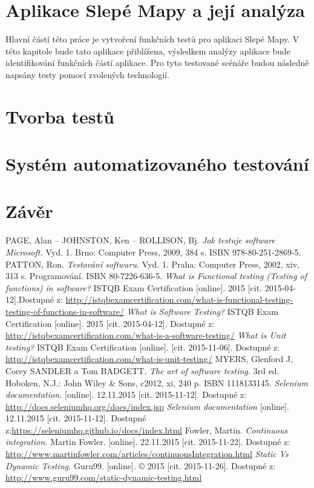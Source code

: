 \documentclass[
    color,   %
	table,   %
    twoside, %
]{fithesis3}
\begin{document}
\chapter{Aplikace Slepé Mapy a její analýza}
Hlavní částí této práce je vytvoření funkčních testů pro aplikaci Slepé Mapy. V této kapitole bude tato aplikace přiblížena, výsledkem analýzy aplikace bude identifikování funkčních částí aplikace. Pro tyto testované scénáře budou následně napsány testy pomocí zvolených technologií.
\chapter{Tvorba testů}
\chapter{Systém automatizovaného testování}
\chapter{Závěr}
\renewcommand{\refname}{Seznam literatury}
\begin{thebibliography}{9}
PAGE, Alan – JOHNSTON, Ken – ROLLISON, Bj. \emph{Jak testuje software Microsoft.} Vyd. 1. Brno: Computer Press, 2009, 384 s. ISBN 978-80-251-2869-5.
PATTON, Ron. \emph{Testování softwaru.} Vyd. 1. Praha: Computer Press, 2002, xiv, 313 s. Programování. ISBN 80-7226-636-5. 
\emph{What is Functional testing (Testing of functions) in software?} ISTQB Exam Certification [online]. 2015 [cit. 2015-04-12].Dostupné z: \url{http://istqbexamcertification.com/what-is-functional-testing-testing-of-functions-in-software/}
\emph{What is Software Testing?} ISTQB Exam Certification [online]. 2015 [cit. 2015-04-12]. Dostupné z: \url{http://istqbexamcertification.com/what-is-a-software-testing/}
\emph{What is Unit testing?} ISTQB Exam Certification [online]. [cit. 2015-11-06]. Dostupné z: \url{http://istqbexamcertification.com/what-is-unit-testing/}
MYERS, Glenford J, Corey SANDLER a Tom BADGETT. \emph{The art of software testing.} 3rd ed. Hoboken, N.J.: John Wiley \& Sons, c2012, xi, 240 p. ISBN 1118133145.
\emph{Selenium documentation.} [online]. 12.11.2015 [cit. 2015-11-12]. Dostupné z: \url{http://docs.seleniumhq.org/docs/index.jsp}
\emph{Selenium documentation} [online]. 12.11.2015 [cit. 2015-11-12]. Dostupné z:\url{https://seleniumhq.github.io/docs/index.html}
Fowler, Martin. \emph{Continuous integration.} Martin Fowler. [online]. 22.11.2015 [cit. 2015-11-22]. Dostupné z: \url{http://www.martinfowler.com/articles/continuousIntegration.html}
 \emph{Static Vs Dynamic Testing.} Guru99. [online]. © 2015 [cit. 2015-11-26]. Dostupné z: \url{http://www.guru99.com/static-dynamic-testing.html}
\end{thebibliography}
\end{document}
